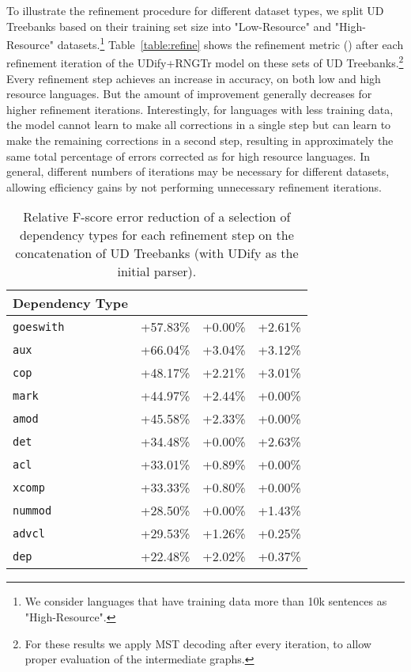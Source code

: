 To illustrate the refinement procedure for different dataset types, we split UD Treebanks based on their training set size into "Low-Resource" and "High-Resource" datasets.\footnote{We consider languages that have training data more than 10k sentences as "High-Resource".}
Table~\ref{table:refine} shows the refinement metric () after each refinement iteration of the UDify+RNGTr model on these sets of UD Treebanks.\footnote{For these results we apply MST decoding after every iteration, to allow proper evaluation of the intermediate graphs.}  Every refinement step achieves an increase in accuracy, on both low and high resource languages.  But the amount of improvement generally decreases for higher refinement iterations.  Interestingly, for languages with less training data, the model cannot learn to make all corrections in a single step but can learn to make the remaining corrections in a second step, resulting in approximately the same total percentage of errors corrected as for high resource languages.
In general, different numbers of iterations may be necessary for different datasets, allowing efficiency gains by not performing unnecessary refinement iterations.


\begin{table}
\centering
  \begin{adjustbox}{width=\linewidth}
    \begin{tabular}{|l|c|c|c|}
    \hline
    Dependency Type &  &  &  \\
    \hline
{\tt goeswith } & +57.83\% & +0.00\%  & +2.61\% \\ [-0.5ex]
{\tt aux } & +66.04\% & +3.04\%  & +3.12\%  \\ [-0.5ex]
{\tt cop } & +48.17\% & +2.21\%  & +3.01\%  \\ [-0.5ex]
{\tt mark } & +44.97\% & +2.44\%  & +0.00\%  \\ [-0.5ex]
{\tt amod } & +45.58\% & +2.33\%  & +0.00\% \\ [-0.5ex] 
{\tt det } & +34.48\% & +0.00\%  & +2.63\%  \\ [-0.5ex]
{\tt acl } & +33.01\% & +0.89\%  & +0.00\%  \\ [-0.5ex]
{\tt xcomp } & +33.33\% & +0.80\%  & +0.00\%  \\ [-0.5ex]
{\tt nummod } & +28.50\% & +0.00\%  & +1.43\% \\ [-0.5ex]
{\tt advcl } & +29.53\% & +1.26\%  & +0.25\%  \\ [-0.5ex]
{\tt dep } & +22.48\% & +2.02\%  & +0.37\%  \\ 
    \hline
    \end{tabular}
  \end{adjustbox}
\caption{Relative F-score error reduction of a selection of dependency types for each refinement step on the concatenation of UD Treebanks (with UDify as the initial parser).
\label{table:acc-deptype}}
\end{table}


